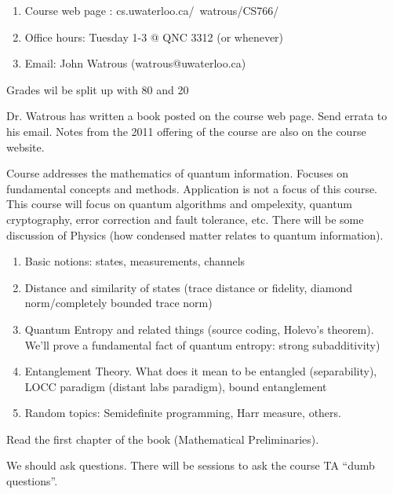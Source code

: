 \date{September 15, 2015}


\begin{enumerate}
    \item{Course web page : cs.uwaterloo.ca/~watrous/CS766/}
    \item{Office hours: Tuesday 1-3 @ QNC 3312 (or whenever)}
    \item{Email: John Watrous (watrous@uwaterloo.ca)}
\end{enumerate}
\begin{section}
    Grades wil be split up with 80%
    and 20%

    Dr. Watrous has written a book posted on the course web page. Send
    errata to his email. Notes from the 2011 offering of the course are
    also on the course website.
    \begin{subsection}
        Course addresses the mathematics of quantum information. Focuses
        on fundamental concepts and methods.  Application is not a focus
        of this course. This course will focus on quantum algorithms and
        ompelexity, quantum cryptography, error correction and fault
        tolerance, etc. There will be some discussion of Physics
        (how condensed matter relates to quantum information).
    \end{subsection}
    \begin{subsection}
        \begin{enumerate}
            \item{Basic notions: states, measurements, channels}
            \item{Distance and similarity of states (trace distance or
                    fidelity, diamond norm/completely bounded trace
                norm)}
            \item{Quantum Entropy and related things (source coding,
                    Holevo's theorem). We'll prove a fundamental fact of
                quantum entropy: strong subadditivity)}
            \item{Entanglement Theory. What does it mean to be entangled
                    (separability), LOCC paradigm (distant labs
                paradigm), bound entanglement}
            \item{Random topics: Semidefinite programming, Harr
                measure, others.}
        \end{enumerate}
    \end{subsection}
    \begin{subsection}
        Read the first chapter of the book (Mathematical Preliminaries).

        We should ask questions. There will be sessions to ask the
        course TA ``dumb questions''.
    \end{subsection}
\end{section}
